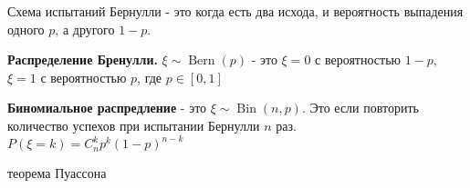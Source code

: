 Схема испытаний Бернулли - это когда есть два исхода, и вероятность выпадения одного $p$, а другого $1-p$.

\textbf{Распределение Бренулли.} $\xi \sim \operatorname{Bern}(p)$ - это $\xi = 0$ с вероятностью $1 - p$,  $\xi = 1$ с вероятностью $p$, где  $p \in [0, 1]$ 

\textbf{Биномиальное распредление} - это $\xi \sim \operatorname{Bin} (n, p)$. Это если повторить количество успехов при испытании Бернулли $n$ раз. $P(\xi = k) = C_n^k p^k (1-p)^{n-k}$

{\color{red} теорема Пуассона}

